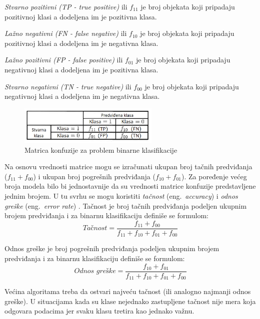 \documentclass[12pt,oneside]{memoir}
\begin{document}
\textit{Stvarno pozitivni (TP - true positive)} ili $f_{11}$ je broj objekata koji pripadaju pozitivnoj klasi a dodeljena im je pozitivna klasa.

\textit{Lažno negativni (FN - false negative)} ili $f_{10}$ je broj objekata koji pripadaju pozitivnoj klasi a dodeljena im je negativna klasa.

\textit{Lažno pozitivni (FP - false positive)} ili $f_{01}$ je broj objekata koji pripadaju negativnoj klasi a dodeljena im je pozitivna klasa.

\textit{Stvarno negativni (TN - true negative)} ili $f_{00}$ je broj objekata koji pripadaju negativnoj klasi a dodeljena im je negativna klasa.

\begin{figure}[!ht]
  \centering
  \includegraphics[width=0.60\textwidth]{matrica_konfuzije}
  \caption{Matrica konfuzije za problem binarne klasifikacije}
  \label{fig:matrkonf}
\end{figure}

Na osnovu vrednosti matrice mogu se izračunati ukupan broj tačnih predviđanja ($f_{11}+f_{00}$) i ukupan broj pogrešnih predviđanja ($f_{10}+f_{01}$). Za poređenje većeg broja modela bilo bi jednostavnije da su vrednosti matrice konfuzije predstavljene jednim brojem. U tu svrhu se mogu koristiti \textit{tačnost} (eng.~\textit{accuracy})  i \textit{odnos greške} (eng.~\textit{error rate}) \cite{mitic}. Tačnost je broj tačnih predviđanja podeljen ukupnim brojem predviđanja i za binarnu klasifikaciju definiše se formulom: 
$$ \textit{Tačnost} = \frac{f_{11}+f_{00}}{f_{11}+f_{10}+f_{01}+f_{00}} $$

Odnos greške je broj pogrešnih predviđanja podeljen ukupnim brojem predviđanja i za binarnu klasifikaciju definiše se formulom:
$$ \textit{Odnos greške} = \frac{f_{10}+f_{01}}{f_{11}+f_{10}+f_{01}+f_{00}} $$

Većina algoritama treba da ostvari najveću tačnost (ili analogno najmanji odnos greške). U situacijama kada su klase nejednako zastupljene tačnost nije mera koja odgovara podacima jer svaku klasu tretira kao jednako važnu. 

\end{document}
